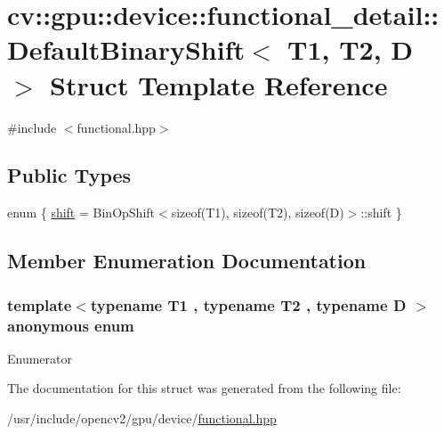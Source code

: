 \hypertarget{structcv_1_1gpu_1_1device_1_1functional__detail_1_1DefaultBinaryShift}{\section{cv\-:\-:gpu\-:\-:device\-:\-:functional\-\_\-detail\-:\-:Default\-Binary\-Shift$<$ T1, T2, D $>$ Struct Template Reference}
\label{structcv_1_1gpu_1_1device_1_1functional__detail_1_1DefaultBinaryShift}
}


{\ttfamily \#include $<$functional.\-hpp$>$}

\subsection*{Public Types}
\begin{DoxyCompactItemize}
\item 
enum \{ \hyperlink{structcv_1_1gpu_1_1device_1_1functional__detail_1_1DefaultBinaryShift_ad9952b8a5611d5450e235ae53da5dd00af53eb51154cb94095e47796b219e11b9}{shift} = Bin\-Op\-Shift$<$sizeof(T1), sizeof(T2), sizeof(D)$>$\-:\-:shift
 \}
\end{DoxyCompactItemize}


\subsection{Member Enumeration Documentation}
\hypertarget{structcv_1_1gpu_1_1device_1_1functional__detail_1_1DefaultBinaryShift_ad9952b8a5611d5450e235ae53da5dd00}{\subsubsection[{anonymous enum}]{\setlength{\rightskip}{0pt plus 5cm}template$<$typename T1 , typename T2 , typename D $>$ anonymous enum}}\label{structcv_1_1gpu_1_1device_1_1functional__detail_1_1DefaultBinaryShift_ad9952b8a5611d5450e235ae53da5dd00}
\begin{Desc}
\item[Enumerator]\par
\begin{description}
\item[{\em 
\hypertarget{structcv_1_1gpu_1_1device_1_1functional__detail_1_1DefaultBinaryShift_ad9952b8a5611d5450e235ae53da5dd00af53eb51154cb94095e47796b219e11b9}{shift}\label{structcv_1_1gpu_1_1device_1_1functional__detail_1_1DefaultBinaryShift_ad9952b8a5611d5450e235ae53da5dd00af53eb51154cb94095e47796b219e11b9}
}]\end{description}
\end{Desc}


The documentation for this struct was generated from the following file\-:\begin{DoxyCompactItemize}
\item 
/usr/include/opencv2/gpu/device/\hyperlink{functional_8hpp}{functional.\-hpp}\end{DoxyCompactItemize}
